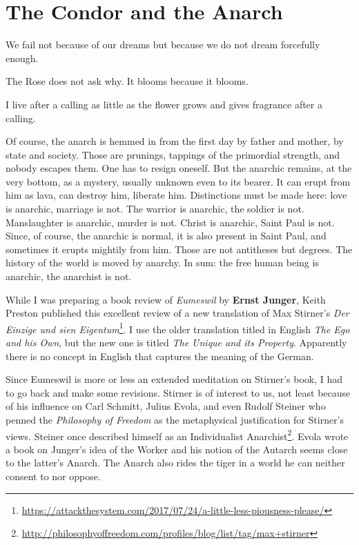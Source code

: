 \section{The Condor and the Anarch}

\begin{quotex}
We fail not because of our dreams but because we do not dream forcefully enough. 

The Rose does not ask why. It blooms because it blooms. 

I live after a calling as little as the flower grows and gives fragrance after a calling. 

Of course, the anarch is hemmed in from the first day by father and mother, by state and society. Those are prunings, tappings of the primordial strength, and nobody escapes them. One has to resign oneself. But the anarchic remains, at the very bottom, as a mystery, usually unknown even to its bearer. It can erupt from him as lava, can destroy him, liberate him. Distinctions must be made here: love is anarchic, marriage is not. The warrior is anarchic, the soldier is not. Manslaughter is anarchic, murder is not. Christ is anarchic, Saint Paul is not. Since, of course, the anarchic is normal, it is also present in Saint Paul, and sometimes it erupts mightily from him. Those are not antitheses but degrees. The history of the world is moved by anarchy. In sum: the free human being is anarchic, the anarchist is not. 

\end{quotex}
While I was preparing a book review of \emph{Eumeswil} by \textbf{Ernst Junger}, Keith Preston published this excellent review of a new translation of Max Stirner's \textit{Der Einzige und sien Eigentum}\footnote{\url{https://attackthesystem.com/2017/07/24/a-little-less-piousness-please/}}. I use the older translation titled in English \emph{The Ego and his Own}, but the new one is titled \emph{The Unique and its Property}. Apparently there is no concept in English that captures the meaning of the German.

Since Eumeswil is more or less an extended meditation on Stirner's book, I had to go back and make some revisions. Stirner is of interest to us, not least because of his influence on Carl Schmitt, Julius Evola, and even Rudolf Steiner who penned the \emph{Philosophy of Freedom} as the metaphysical justification for Stirner's views. Steiner once described himself as an Individualist Anarchist\footnote{\url{http://philosophyoffreedom.com/profiles/blog/list/tag/max+stirner}}. Evola wrote a book on Junger's idea of the Worker and his notion of the Autarch seems close to the latter's Anarch. The Anarch also rides the tiger in a world he can neither consent to nor oppose.

